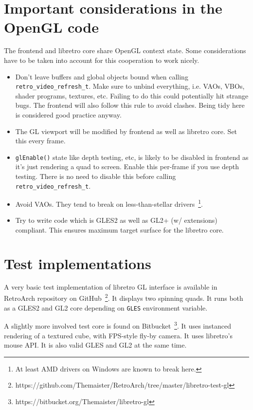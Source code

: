 \documentclass[11pt]{article}
\begin{document}
\section*{Important considerations in the OpenGL code}
The frontend and libretro core share OpenGL context state. Some considerations have to be taken into account for this cooperation to work nicely.

\begin{itemize}
\item Don't leave buffers and global objects bound when calling \\\texttt{retro\_video\_refresh\_t}.
Make sure to unbind everything, i.e. VAOs, VBOs, shader programs, textures, etc. Failing to do this could potentially hit strange bugs. The frontend will also follow this rule to avoid clashes. Being tidy here is considered good practice anyway.

\item The GL viewport will be modified by frontend as well as libretro core. Set this every frame.

\item \texttt{glEnable()} state like depth testing, etc, is likely to be disabled in frontend as it's just rendering a quad to screen. Enable this per-frame if you use depth testing.
There is no need to disable this before calling \\\texttt{retro\_video\_refresh\_t}.

\item Avoid VAOs. They tend to break on less-than-stellar drivers~\footnote{At least AMD drivers on Windows are known to break here.}.

\item Try to write code which is GLES2 as well as GL2+ (w/ extensions) compliant. This ensures maximum target surface for the libretro core.
\end{itemize} 

\section*{Test implementations}
A very basic test implementation of libretro GL interface is available in RetroArch repository on GitHub~\footnote{https://github.com/Themaister/RetroArch/tree/master/libretro-test-gl}.
It displays two spinning quads. It runs both as a GLES2 and GL2 core depending on \texttt{GLES} environment variable.

A slightly more involved test core is found on Bitbucket~\footnote{https://bitbucket.org/Themaister/libretro-gl}. It uses instanced rendering of a textured cube, with FPS-style fly-by camera. It uses libretro's mouse API. It is also valid GLES and GL2 at the same time.
\end{document}
